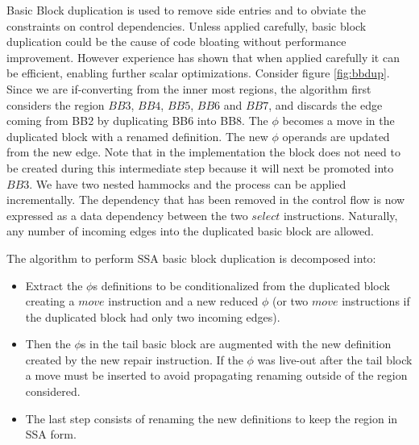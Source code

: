 Basic Block duplication is used to remove side entries and to obviate the constraints on control dependencies. Unless applied carefully, basic block duplication could be the cause of code bloating without performance improvement. However experience has shown that when applied carefully it can be efficient, enabling further scalar optimizations.
Consider figure \ref{fig:bbdup}. Since we are if-converting from the inner most regions, the algorithm first considers the region $BB3$, $BB4$, $BB5$, $BB6$ and $BB7$, and discards the edge coming from BB2 by duplicating BB6 into BB8. The $\phi$ becomes a move in the duplicated block with a renamed definition. The new $\phi$ operands are updated from the new edge. Note that in the implementation the block does not need to be created during this intermediate step because it will next be promoted into $BB3$. We have two nested hammocks and the process can be applied incrementally. The dependency that has been removed in the control flow is now expressed as a data dependency between the two $select$ instructions.
Naturally, any number of incoming edges into the duplicated basic block are allowed.

The algorithm to perform SSA basic block duplication is decomposed into:
\begin{itemize}
\item Extract the $\phi$s definitions to be conditionalized from the duplicated block creating a $move$ instruction and a new reduced $\phi$ (or two $move$ instructions if the duplicated block had only two incoming edges).
\item Then the $\phi$s in the tail basic block are augmented with the new definition created by the new repair instruction. If the $\phi$ was live-out after the tail block a move must be inserted to avoid propagating renaming outside of the region considered. 
\item The last step consists of renaming the new definitions to keep the region in SSA form.
\end{itemize}

